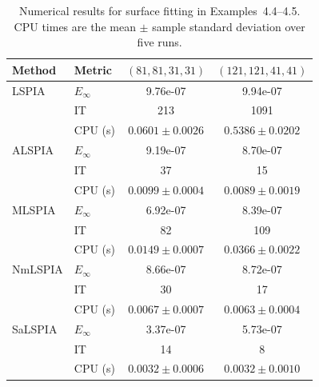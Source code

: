 \begin{table}[t]
\centering
\caption{Numerical results for surface fitting in Examples~4.4--4.5. CPU times are the mean $\pm$ sample standard deviation over five runs.}
\label{tab:surface_results_cpu_sd_part1}
\begin{tabular}{llcc}
\hline
Method & Metric & $(81,81,31,31)$ & $(121,121,41,41)$ \\
\hline
LSPIA & $E_\infty$ & 9.76e-07 & 9.94e-07 \\
 & IT & 213 & 1091 \\
 & CPU (s) & $0.0601 \pm 0.0026$ & $0.5386 \pm 0.0202$ \\
ALSPIA & $E_\infty$ & 9.19e-07 & 8.70e-07 \\
 & IT & 37 & 15 \\
 & CPU (s) & $0.0099 \pm 0.0004$ & $0.0089 \pm 0.0019$ \\
MLSPIA & $E_\infty$ & 6.92e-07 & 8.39e-07 \\
 & IT & 82 & 109 \\
 & CPU (s) & $0.0149 \pm 0.0007$ & $0.0366 \pm 0.0022$ \\
NmLSPIA & $E_\infty$ & 8.66e-07 & 8.72e-07 \\
 & IT & 30 & 17 \\
 & CPU (s) & $0.0067 \pm 0.0007$ & $0.0063 \pm 0.0004$ \\
SaLSPIA & $E_\infty$ & 3.37e-07 & 5.73e-07 \\
 & IT & 14 & 8 \\
 & CPU (s) & $0.0032 \pm 0.0006$ & $0.0032 \pm 0.0010$ \\
\hline
\end{tabular}
\end{table}
